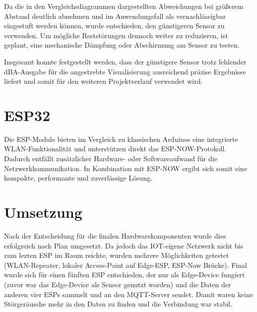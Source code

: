 Da die in den Vergleichsdiagrammen dargestellten Abweichungen bei größerem Abstand deutlich abnehmen und im Anwendungsfall als vernachlässigbar eingestuft werden können, wurde entschieden, den günstigeren Sensor zu verwenden. 
Um mögliche Reststörungen dennoch weiter zu reduzieren, ist geplant, eine mechanische Dämpfung oder Abschirmung am Sensor zu testen.

Insgesamt konnte festgestellt werden, dass der günstigere Sensor trotz fehlender dBA-Ausgabe für die angestrebte Visualisierung ausreichend präzise Ergebnisse liefert und somit für den weiteren Projektverlauf verwendet wird.

\section{ESP32}
Die ESP-Module bieten im Vergleich zu klassischen Arduinos eine integrierte WLAN-Funktionalität und unterstützen direkt das ESP-NOW-Protokoll. Dadurch entfällt zusätzlicher Hardware- oder Softwareaufwand für die Netzwerkkommunikation.
In Kombination mit ESP-NOW ergibt sich somit eine kompakte, performante und zuverlässige Lösung.

\section{Umsetzung}
Nach der Entscheidung für die finalen Hardwarekomponenten wurde dies erfolgreich nach Plan umgesetzt.
Da jedoch das IOT-eigene Netzwerk nicht bis zum lezten ESP im Raum reichte, wurden mehrere Möglichkeiten getestet (WLAN-Repeater, lokaler Access-Point auf Edge-ESP, ESP-Now Brücke).
Final wurde sich für einen fünften ESP entschieden, der nur als Edge-Device fungiert (zuvor war das Edge-Device als Sensor genutzt worden) und die Daten der anderen vier ESPs sammelt und an den MQTT-Server sendet.
Damit waren keine Störgeräusche mehr in den Daten zu finden und die Verbindung war stabil.
